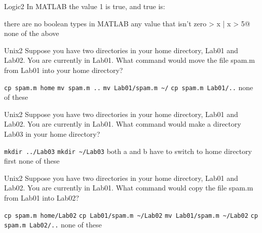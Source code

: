 \documentclass[master]{exam}
\begin{document}
\begin{problem}{Logic}{2}
    In MATLAB the value 1 is true, and true is:
    
    \begin{answers}
        \answer there are no boolean types in MATLAB
        \answer[correct] any value that isn't zero
        \answer {} > x | x > 5@
        \answer[fixed] none of the above 
    \end{answers}
\end{problem}

\begin{problem}{Unix}{2}
    Suppose you have two directories in your home directory, Lab01 and
    Lab02. You are currently in Lab01. What command would move the file
    spam.m from Lab01 into your home directory?
    
    \begin{answers}
        \answer \verb+cp spam.m home+
        \answer[correct] \verb+mv spam.m ..+
        \answer \verb+mv Lab01/spam.m ~/+
        \answer \verb+cp spam.m Lab01/..+
        \answer[fixed] none of these  
    \end{answers}
\end{problem}

\begin{problem}{Unix}{2}
    Suppose you have two directories in your home directory, Lab01 and
    Lab02. You are currently in Lab01. What command would make a directory
    Lab03 in your home directory?
    
    \begin{answers}
        \answer \verb+mkdir ../Lab03+
        \answer \verb+mkdir ~/Lab03+
        \answer[correct] both a and b
        \answer have to switch to home directory first
        \answer[fixed] none of these  
    \end{answers}
\end{problem}

\begin{problem}{Unix}{2}
    Suppose you have two directories in your home directory, Lab01 and
    Lab02. You are currently in Lab01. What command would copy the file
    spam.m from Lab01 into Lab02?
    
    \begin{answers}
        \answer \verb+cp spam.m home/Lab02+
        \answer \verb+cp Lab01/spam.m ~/Lab02+
        \answer \verb+mv Lab01/spam.m ~/Lab02+
        \answer \verb+cp spam.m Lab02/..+
         none of these
    \end{answers}
\end{problem}
\end{document}
